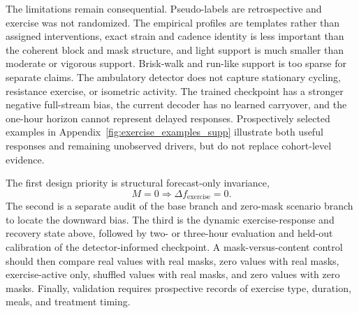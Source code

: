 The limitations remain consequential. Pseudo-labels are retrospective and
exercise was not randomized. The empirical profiles are templates rather than
assigned interventions, exact strain and cadence identity is less important
than the coherent block and mask structure, and light support is much smaller
than moderate or vigorous support. Brisk-walk and run-like support is too sparse
for separate claims. The ambulatory detector does not capture stationary
cycling, resistance exercise, or isometric activity. The trained checkpoint
has a stronger negative full-stream bias, the current decoder has no learned
carryover, and the one-hour horizon cannot represent delayed responses.
Prospectively selected examples in Appendix~\ref{fig:exercise_examples_supp}
illustrate both useful responses and remaining unobserved drivers, but do not
replace cohort-level evidence.

The first design priority is structural forecast-only invariance,
\begin{equation}
  M=0 \Longrightarrow \Delta f_{\mathrm{exercise}}=0.
  \label{eq:exercise_forecast_invariance}
\end{equation}
The second is a separate audit of the base branch and zero-mask scenario branch
to locate the downward bias. The third is the dynamic exercise-response and
recovery state above, followed by two- or three-hour evaluation and held-out
calibration of the detector-informed checkpoint. A mask-versus-content control
should then compare real values with real masks, zero values with real masks,
exercise-active only, shuffled values with real masks, and zero values with
zero masks. Finally, validation requires prospective records of exercise type,
duration, meals, and treatment timing.
